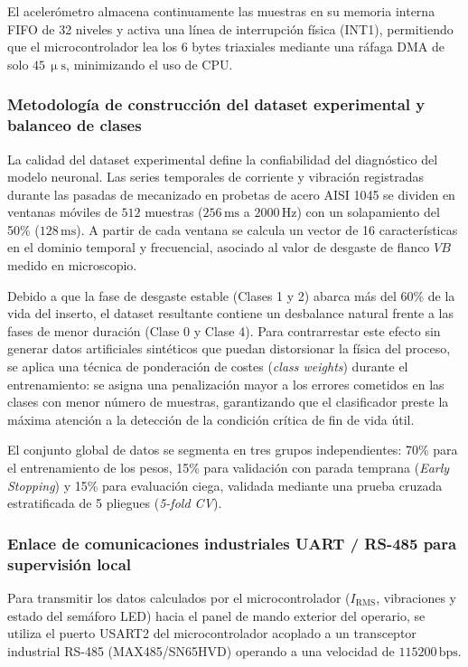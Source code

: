 El acelerómetro almacena continuamente las muestras en su memoria interna FIFO de 32 niveles y activa una línea de interrupción física (INT1), permitiendo que el microcontrolador lea los 6 bytes triaxiales mediante una ráfaga DMA de solo $45\,\upmu\text{s}$, minimizando el uso de CPU.

\subsubsection{Metodología de construcción del dataset experimental y balanceo de clases}

La calidad del dataset experimental define la confiabilidad del diagnóstico del modelo neuronal. Las series temporales de corriente y vibración registradas durante las pasadas de mecanizado en probetas de acero AISI 1045 se dividen en ventanas móviles de $512$ muestras ($256\,\text{ms}$ a $2000\,\text{Hz}$) con un solapamiento del 50\% ($128\,\text{ms}$). A partir de cada ventana se calcula un vector de 16 características en el dominio temporal y frecuencial, asociado al valor de desgaste de flanco $VB$ medido en microscopio.

Debido a que la fase de desgaste estable (Clases 1 y 2) abarca más del 60\% de la vida del inserto, el dataset resultante contiene un desbalance natural frente a las fases de menor duración (Clase 0 y Clase 4). Para contrarrestar este efecto sin generar datos artificiales sintéticos que puedan distorsionar la física del proceso, se aplica una técnica de ponderación de costes (\textit{class weights}) durante el entrenamiento: se asigna una penalización mayor a los errores cometidos en las clases con menor número de muestras, garantizando que el clasificador preste la máxima atención a la detección de la condición crítica de fin de vida útil.

El conjunto global de datos se segmenta en tres grupos independientes: 70\% para el entrenamiento de los pesos, 15\% para validación con parada temprana (\textit{Early Stopping}) y 15\% para evaluación ciega, validada mediante una prueba cruzada estratificada de 5 pliegues (\textit{5-fold CV}).

\subsubsection{Enlace de comunicaciones industriales UART / RS-485 para supervisión local}

Para transmitir los datos calculados por el microcontrolador ($I_{\text{RMS}}$, vibraciones y estado del semáforo LED) hacia el panel de mando exterior del operario, se utiliza el puerto USART2 del microcontrolador acoplado a un transceptor industrial RS-485 (MAX485/SN65HVD) operando a una velocidad de $115200\,\text{bps}$.

